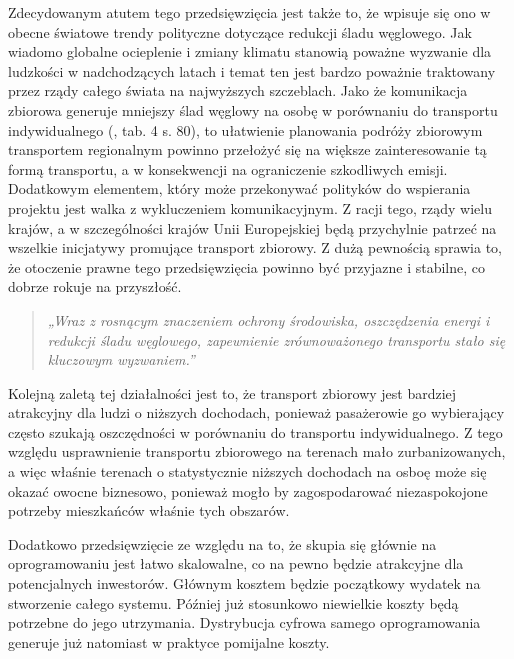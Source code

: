 Zdecydowanym atutem tego przedsięwzięcia jest także to, że wpisuje się ono w obecne światowe trendy polityczne dotyczące redukcji śladu węglowego. Jak wiadomo globalne ocieplenie i zmiany klimatu stanowią poważne wyzwanie dla ludzkości w nadchodzących latach i temat ten jest bardzo poważnie traktowany przez rządy całego świata na najwyższych szczeblach. Jako że komunikacja zbiorowa generuje mniejszy ślad węglowy na osobę w porównaniu do transportu indywidualnego (\citealt{Szymalski_Bukowicka_2022}, tab. 4 s. 80), to ułatwienie planowania podróży zbiorowym transportem regionalnym powinno przełożyć się na większe zainteresowanie tą formą transportu, a w konsekwencji na ograniczenie szkodliwych emisji. Dodatkowym elementem, który może przekonywać polityków do wspierania projektu jest walka z wykluczeniem komunikacyjnym. Z racji tego, rządy wielu krajów, a w szczególności krajów Unii Europejskiej będą przychylnie patrzeć na wszelkie inicjatywy promujące transport zbiorowy. Z dużą pewnością sprawia to, że otoczenie prawne tego przedsięwzięcia powinno być przyjazne i stabilne, co dobrze rokuje na przyszłość.
\begin{quote}\textit{„Wraz z rosnącym znaczeniem ochrony środowiska, oszczędzenia energi i redukcji śladu węglowego, zapewnienie zrównoważonego transportu stało się kluczowym wyzwaniem.”}
\citep{Chung2023-ih} \end{quote}

Kolejną zaletą tej działalności jest to, że transport zbiorowy jest bardziej atrakcyjny dla ludzi o niższych dochodach, ponieważ pasażerowie go wybierający często szukają oszczędności w porównaniu do transportu indywidualnego. \citep{Nimorakiotaki2020-bl} Z tego względu usprawnienie transportu zbiorowego na terenach mało zurbanizowanych, a więc właśnie terenach o statystycznie niższych dochodach na osboę może się okazać owocne biznesowo, ponieważ mogło by zagospodarować niezaspokojone potrzeby mieszkańców właśnie tych obszarów.

Dodatkowo przedsięwzięcie ze względu na to, że skupia się głównie na oprogramowaniu jest łatwo skalowalne, co na pewno będzie atrakcyjne dla potencjalnych inwestorów. Głównym kosztem będzie początkowy wydatek na stworzenie całego systemu. Później już stosunkowo niewielkie koszty będą potrzebne do jego utrzymania. Dystrybucja cyfrowa samego oprogramowania generuje już natomiast w praktyce pomijalne koszty.
